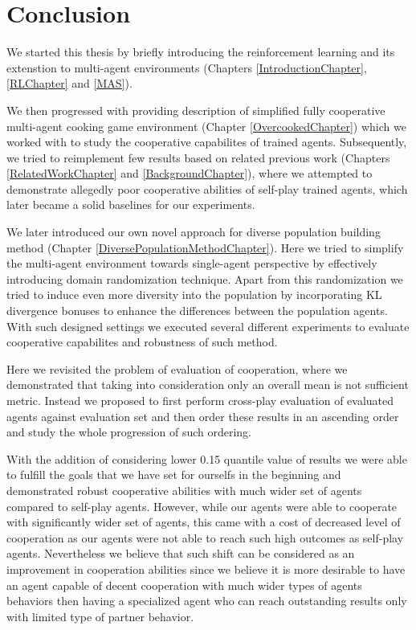 \chapter*{Conclusion}

We started this thesis by briefly introducing the reinforcement learning and its extenstion to multi-agent environments (Chapters \ref{IntroductionChapter}, \ref{RLChapter} and \ref{MAS}).

We then progressed with providing description of simplified fully cooperative multi-agent cooking game environment (Chapter \ref{OvercookedChapter}) which we worked with to study the cooperative capabilites of trained agents. 
Subsequently, we tried to reimplement few results based on related previous work (Chapters \ref{RelatedWorkChapter} and \ref{BackgroundChapter}), where we attempted to demonstrate allegedly poor cooperative abilities of self-play trained agents, which later became a solid baselines for our experiments.

We later introduced our own novel approach for diverse population building method (Chapter \ref{DiversePopulationMethodChapter}).
Here we tried to simplify the multi-agent environment towards single-agent perspective by effectively introducing domain randomization technique.
Apart from this randomization we tried to induce even more diversity into the population by incorporating KL divergence bonuses to enhance the differences between the population agents.
With such designed settings we executed several different experiments to evaluate cooperative capabilites and robustness of such method. 

Here we revisited the problem of evaluation of cooperation, where we demonstrated that taking into consideration only an overall mean is not sufficient metric.
Instead we proposed to first perform cross-play evaluation of evaluated agents against evaluation set and then order these results in an ascending order and study the whole progression of such ordering.

With the addition of considering lower 0.15 quantile value of results we were able to fulfill the goals that we have set for ourselfs in the beginning and demonstrated robust cooperative abilities with much wider set of agents compared to self-play agents.
However, while our agents were able to cooperate with significantly wider set of agents, this came with a cost of decreased level of cooperation as our agents were not able to reach such high outcomes as self-play agents.
Nevertheless we believe that such shift can be considered as an improvement in cooperation abilities since we believe it is more desirable to have an agent capable of decent cooperation with much wider types of agents behaviors then having a specialized agent who can reach outstanding results only with limited type of partner behavior.

